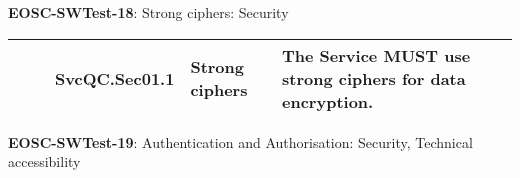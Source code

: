 \textbf{EOSC-SWTest-18}: Strong ciphers: Security
\nopagebreak[4]
\begin{center}
    \tabletail{\hline}
    \tiny
    \begin{supertabular}{|p{0.10\linewidth}|p{0.10\linewidth}|p{0.20\linewidth}|p{0.60\linewidth}|} \hline
        \cite{orviz_fernandez_eosc-synergy_2020} & SvcQC.Sec01.1 & Strong ciphers & The Service MUST use strong ciphers for data encryption.\\ \hline
    \end{supertabular}
\end{center}

\textbf{EOSC-SWTest-19}: Authentication and Authorisation: Security, Technical accessibility
\nopagebreak[4]
